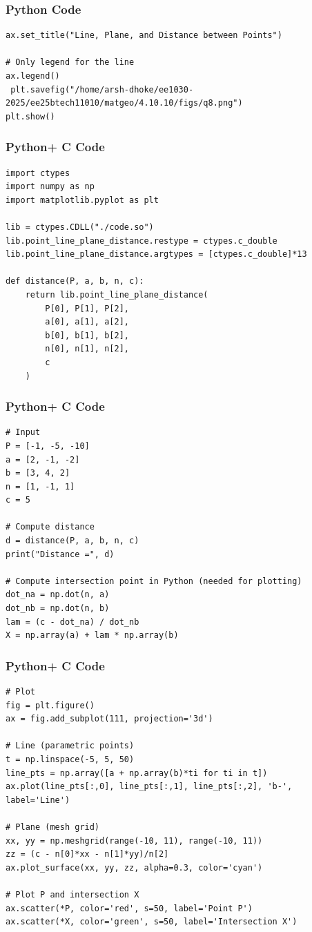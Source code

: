 \documentclass{beamer}
\begin{document}
\begin{frame}[fragile]
    \frametitle{Python Code}
\begin{lstlisting}
ax.set_title("Line, Plane, and Distance between Points")

# Only legend for the line
ax.legend()
 plt.savefig("/home/arsh-dhoke/ee1030-2025/ee25btech11010/matgeo/4.10.10/figs/q8.png")
plt.show()

\end{lstlisting}
\end{frame}

\begin{frame}[fragile]
    \frametitle{Python+ C Code}
\begin{lstlisting}
import ctypes
import numpy as np
import matplotlib.pyplot as plt

lib = ctypes.CDLL("./code.so")
lib.point_line_plane_distance.restype = ctypes.c_double
lib.point_line_plane_distance.argtypes = [ctypes.c_double]*13

def distance(P, a, b, n, c):
    return lib.point_line_plane_distance(
        P[0], P[1], P[2],
        a[0], a[1], a[2],
        b[0], b[1], b[2],
        n[0], n[1], n[2],
        c
    )
\end{lstlisting}
\end{frame}

\begin{frame}[fragile]
    \frametitle{Python+ C Code}
\begin{lstlisting}
# Input
P = [-1, -5, -10]
a = [2, -1, -2]
b = [3, 4, 2]
n = [1, -1, 1]
c = 5

# Compute distance
d = distance(P, a, b, n, c)
print("Distance =", d)

# Compute intersection point in Python (needed for plotting)
dot_na = np.dot(n, a)
dot_nb = np.dot(n, b)
lam = (c - dot_na) / dot_nb
X = np.array(a) + lam * np.array(b)
\end{lstlisting}
\end{frame}

\begin{frame}[fragile]
    \frametitle{Python+ C Code}
\begin{lstlisting}
# Plot
fig = plt.figure()
ax = fig.add_subplot(111, projection='3d')

# Line (parametric points)
t = np.linspace(-5, 5, 50)
line_pts = np.array([a + np.array(b)*ti for ti in t])
ax.plot(line_pts[:,0], line_pts[:,1], line_pts[:,2], 'b-', label='Line')

# Plane (mesh grid)
xx, yy = np.meshgrid(range(-10, 11), range(-10, 11))
zz = (c - n[0]*xx - n[1]*yy)/n[2]
ax.plot_surface(xx, yy, zz, alpha=0.3, color='cyan')

# Plot P and intersection X
ax.scatter(*P, color='red', s=50, label='Point P')
ax.scatter(*X, color='green', s=50, label='Intersection X')
\end{lstlisting}
\end{frame}
\end{document}

